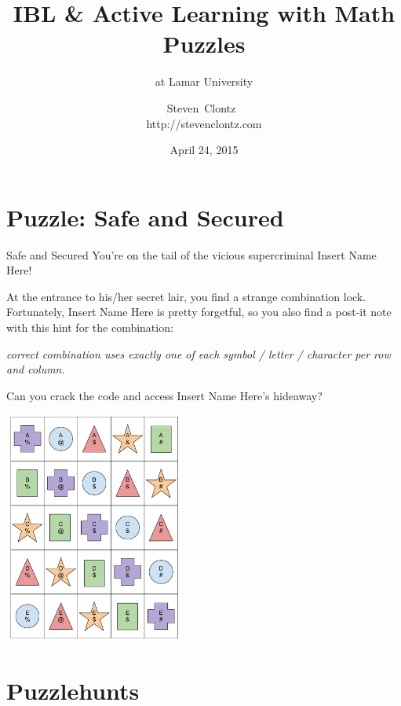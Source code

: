 \documentclass{beamer}
\title
{IBL \& Active Learning with Math Puzzles}
\subtitle
{at Lamar University} %
\author%
{Steven~Clontz~\\http://stevenclontz.com}%
\institute[Auburn University] %
{
  Department of Mathematics and Statistics\\
  Auburn University}
\date[15-04-24] %
{April 24, 2015}
\theoremstyle{theorem}
\theoremstyle{definition}
\newcommand{\<}{\langle}
\renewcommand{\>}{\rangle}
\newcommand{\vpause}{\pause\vspace{1em}}
\begin{document}

\begin{frame}
  \titlepage
\end{frame}


\section{Puzzle: Safe and Secured}

\begin{frame}{Safe and Secured}
  You're on the tail of the vicious supercriminal Insert Name Here!

  \vpause

  At the entrance to his/her secret lair, you find a strange combination
  lock. Fortunately, Insert Name Here is pretty forgetful, so you also find
  a post-it note with this hint for the combination:

  \vpause

  \textit{%
    correct combination uses exactly one of each symbol / letter /
    character per row and column.
  }

  \vpause

  Can you crack the code and access Insert Name Here's hideaway?
\end{frame}

\begin{frame}
  \centerline{\includegraphics[height=3in]{safeAndSecured.pdf}}
\end{frame}

\section{Puzzlehunts}
\end{document}

